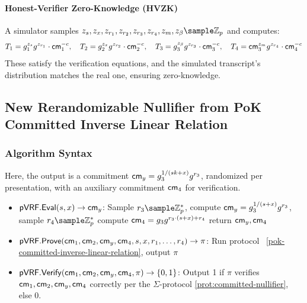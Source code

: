 \paragraph{Honest-Verifier Zero-Knowledge (HVZK)}
A simulator samples $z_{s}, z_x, z_{r_1}, z_{r_2}, z_{r_3}, z_{r_4}, z_m, z_{\beta} \sample \mathbb{Z}_p$ and computes:
\[
T_1 = g_1^{z_{s}} g^{z_{r_1}} \cdot \mathsf{cm}_1^{-c}, \quad T_2 = g_2^{z_x} g^{z_{r_2}} \cdot \mathsf{cm}_2^{-c}, \quad T_3 = g_3^{z_{\beta}} g^{z_{r_3}} \cdot \mathsf{cm}_3^{-c}, \quad T_4 = \mathsf{cm}_3^{z_m} g^{z_{r_4}} \cdot \mathsf{cm}_4^{-c}
\]
These satisfy the verification equations, and the simulated transcript’s distribution matches the real one, ensuring zero-knowledge.






































\subsection{New Rerandomizable Nullifier from PoK Committed Inverse Linear Relation}\label{sec-probabilistic-nullifier}

\subsubsection{Algorithm Syntax}
Here, the output is a commitment $\mathsf{cm}_y = g_3^{1/(sk + x)} g^{r_3}$, randomized per presentation, with an auxiliary commitment $\mathsf{cm}_4$ for verification.

\begin{itemize}
    \item $\mathsf{pVRF.Eval}(s, x) \to \mathsf{cm}_y$: Sample $r_3 \sample \Z_p^*$, compute $\mathsf{cm}_y = g_3^{1/(s+x)}g^{r_3}$, sample $r_4 \sample \Z_p^*$ compute $\mathsf{cm}_4 = g_3g^{r_3 \cdot (s+x) + r_4}$ return $\mathsf{cm}_y, \mathsf{cm}_4$
    
    \item $\mathsf{pVRF.Prove}(\mathsf{cm}_1, \mathsf{cm}_2, \mathsf{cm}_y, \mathsf{cm}_4, s, x, r_1, \ldots, r_4) \to \pi$: Run protocol ~\ref{pok-committed-inverse-linear-relation}, output $\pi$
    
    \item $\mathsf{pVRF.Verify}(\mathsf{cm}_1, \mathsf{cm}_2, \mathsf{cm}_y, \mathsf{cm}_4, \pi) \to \{0,1\}$: Output 1 if $\pi$ verifies $\mathsf{cm}_1, \mathsf{cm}_2, \mathsf{cm}_y, \mathsf{cm}_4$ correctly per the $\Sigma$-protocol \ref{prot:committed-nullifier}, else 0.
\end{itemize}




